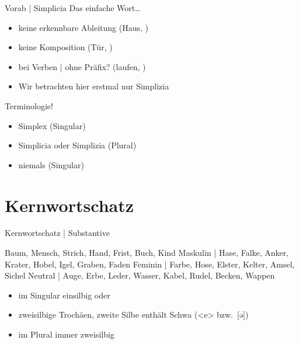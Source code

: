 \begin{frame}
  {Vorab | Simplicia}
  \onslide<+->
  \onslide<+->
  Das \alert{einfache} Wort…\\
  \Halbzeile
  \begin{itemize}[<+->]
    \item keine erkennbare Ableitung (\alert{Haus}, )
    \item keine Komposition (\alert{Tür}, )
    \item bei Verben | ohne Präfix? (\alert{laufen}, )
      \Halbzeile
    \item \alert{Wir betrachten hier erstmal nur Simplizia}
  \end{itemize}
      \Zeile
      \onslide<+->
   Terminologie!\\
  \Halbzeile
  \begin{itemize}[<+->]
    \item \alert{Simplex} (Singular)
    \item \alert{Simplicia} oder \alert{Simplizia} (Plural)
      \Halbzeile
    \item niemals  (Singular)
  \end{itemize}
\end{frame}

\section{Kernwortschatz}

\begin{frame}
  {Kernwortschatz | Substantive}
  \onslide<+->
  \onslide<+->
  \begin{exe}
    \ex Baum, Mensch, Strich, Hand, Frist, Buch, Kind
    \Halbzeile
    \onslide<+->
    \ex \alert{Maskulin} | Hase, Falke, Anker, Krater, Hobel, Igel, Graben, Faden
    \onslide<+->
    \ex \alert{Feminin} | Farbe, Hose, Elster, Kelter, Amsel, Sichel
    \onslide<+->
    \ex \alert{Neutral} | Auge, Erbe, Leder, Wasser, Kabel, Rudel, Becken, Wappen
  \end{exe}
  \onslide<+->
  \Zeile
  \begin{itemize}[<+->]
    \item im Singular einsilbig oder
    \item zweisilbige Trochäen, zweite Silbe enthält \alert{Schwa} (<e> bzw.\ [ə])
      \Halbzeile
    \item im Plural immer zweisilbig
  \end{itemize}
\end{frame}

